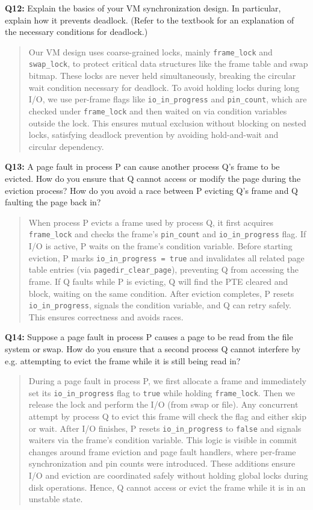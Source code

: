 \documentclass[a4paper,11pt]{paper}
\begin{document}
\textbf{Q12:} Explain the basics of your VM synchronization design.  In particular, explain how it prevents deadlock.  (Refer to the textbook for an explanation of the necessary conditions for deadlock.)
\begin{quote}
Our VM design uses coarse-grained locks, mainly \texttt{frame\_lock} and \texttt{swap\_lock}, to protect critical data structures like the frame table and swap bitmap. These locks are never held simultaneously, breaking the circular wait condition necessary for deadlock. To avoid holding locks during long I/O, we use per-frame flags like \texttt{io\_in\_progress} and \texttt{pin\_count}, which are checked under \texttt{frame\_lock} and then waited on via condition variables outside the lock. This ensures mutual exclusion without blocking on nested locks, satisfying deadlock prevention by avoiding hold-and-wait and circular dependency.
\end{quote}


\textbf{Q13:} A page fault in process P can cause another process Q's frame to be evicted. How do you ensure that Q cannot access or modify the page during the eviction process?  How do you avoid a race between P evicting Q's frame and Q faulting the page back in?
\begin{quote}
When process P evicts a frame used by process Q, it first acquires \texttt{frame\_lock} and checks the frame’s \texttt{pin\_count} and \texttt{io\_in\_progress} flag. If I/O is active, P waits on the frame’s condition variable. Before starting eviction, P marks \texttt{io\_in\_progress = true} and invalidates all related page table entries (via \texttt{pagedir\_clear\_page}), preventing Q from accessing the frame. If Q faults while P is evicting, Q will find the PTE cleared and block, waiting on the same condition. After eviction completes, P resets \texttt{io\_in\_progress}, signals the condition variable, and Q can retry safely. This ensures correctness and avoids races.
\end{quote}


\textbf{Q14:} Suppose a page fault in process P causes a page to be read from the file system or swap.  How do you ensure that a second process Q cannot interfere by e.g. attempting to evict the frame while it is still being read in?
\begin{quote}
During a page fault in process P, we first allocate a frame and immediately set its \texttt{io\_in\_progress} flag to \texttt{true} while holding \texttt{frame\_lock}. Then we release the lock and perform the I/O (from swap or file). Any concurrent attempt by process Q to evict this frame will check the flag and either skip or wait. After I/O finishes, P resets \texttt{io\_in\_progress} to \texttt{false} and signals waiters via the frame's condition variable. This logic is visible in commit changes around frame eviction and page fault handlers, where per-frame synchronization and pin counts were introduced. These additions ensure I/O and eviction are coordinated safely without holding global locks during disk operations. Hence, Q cannot access or evict the frame while it is in an unstable state.
\end{quote}
\end{document}
